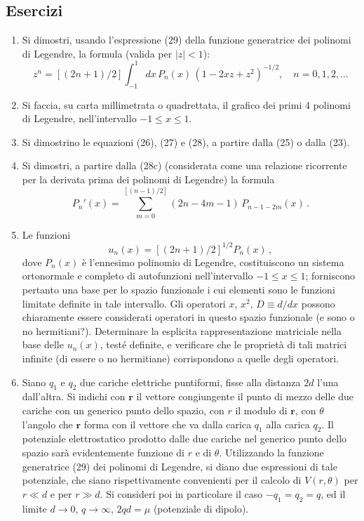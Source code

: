 \documentclass[11pt, a4paper]{book}
\numberwithin{equation}{section}
\newenvironment{esercizi}{\subsection*{Esercizi}\begin{enumerate}}{\end{enumerate}}
\begin{document}
\begin{esercizi}
\begin{enumerate}

\item[8.] Si dimostri, usando l'espressione (29) della funzione generatrice dei polinomi di Legendre, la formula (valida per $|z|<1$):
\[
z^n = \left[(2n+1)/2\right] \int_{-1}^{1} dx\, P_n(x)\, (1-2xz+z^2)^{-1/2}, \quad n=0,1,2,\ldots
\]

\item[9.] Si faccia, su carta millimetrata o quadrettata, il grafico dei
primi 4 polinomi di Legendre, nell'intervallo $-1 \leq x \leq 1$.

\item[10.] Si dimostrino le equazioni (26), (27) e (28), a partire dalla (25) o
dalla (23).

\item[11.] Si dimostri, a partire dalla (28c) (considerata come una relazione ricorrente per la derivata prima dei polinomi di Legendre)
la formula
\[
P_n'(x) = \sum_{m=0}^{[(n-1)/2]} (2n - 4m - 1)\, P_{n-1-2m}(x) \,.
\]

\item[12.] Le funzioni
\[
u_n(x) = \left[(2n+1)/2\right]^{1/2} P_n(x) \,,
\]
dove $P_n(x)$ è l'ennesimo polinomio di Legendre, costituiscono un
sistema ortonormale e completo di autofunzioni nell'intervallo
$-1 \leq x \leq 1$; forniscono pertanto una base per lo spazio
funzionale i cui elementi sono le funzioni limitate definite in tale
intervallo. Gli operatori $x$, $x^2$, $D \equiv d/dx$ possono chiaramente essere considerati operatori in questo spazio funzionale
(e sono o no hermitiani?). Determinare la esplicita rappresentazione matriciale nella base delle $u_n(x)$, testé definite, e
verificare che le proprietà di tali matrici infinite (di essere o no hermitiane) corrispondono a quelle degli operatori.

\item[13.] Siano $q_1$ e $q_2$ due cariche elettriche puntiformi, fisse alla distanza
$2d$ l'una dall'altra. Si indichi con $\mathbf{r}$ il vettore congiungente il punto
di mezzo delle due cariche con un generico punto dello spazio, con
$r$ il modulo di $\mathbf{r}$, con $\theta$ l'angolo che $\mathbf{r}$ forma con il vettore che
va dalla carica $q_1$ alla carica $q_2$. Il potenziale elettrostatico prodotto
dalle due cariche nel generico punto dello spazio sarà evidentemente
funzione di $r$ e di $\theta$. Utilizzando la funzione generatrice (29) dei
polinomi di Legendre, si diano due espressioni di tale potenziale, che
siano rispettivamente convenienti per il calcolo di $V(r,\theta)$ per $r \ll d$
e per $r \gg d$. Si consideri poi in particolare il caso $-q_1 = q_2 = q$,
ed il limite $d \to 0$, $q \to \infty$, $2qd = \mu$ (potenziale di dipolo).


\end{enumerate}
\end{esercizi}
\end{document}
